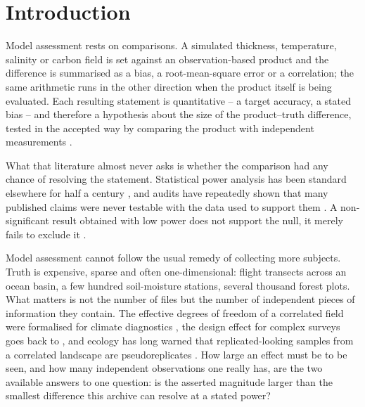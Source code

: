 \documentclass[preprint,12pt,authoryear]{elsarticle}
\begin{document}
\section{Introduction}

Model assessment rests on comparisons. A simulated thickness, temperature, salinity or carbon field is set against an observation-based product and the difference is summarised as a bias, a root-mean-square error or a correlation; the same arithmetic runs in the other direction when the product itself is being evaluated. Each resulting statement is quantitative -- a target accuracy, a stated bias -- and therefore a hypothesis about the size of the product--truth difference, tested in the accepted way by comparing the product with independent measurements \citep[e.g.,][]{loew2017validation,merchant2017uncertainty,taylor2001summarizing}.

What that literature almost never asks is whether the comparison had any chance of resolving the statement. Statistical power analysis has been standard elsewhere for half a century \citep{cohen1992power,lenth2001some,nakagawa2007effect}, and audits have repeatedly shown that many published claims were never testable with the data used to support them \citep{sedlmeier1989do,ioannidis2005why,button2013power}. A non-significant result obtained with low power does not support the null, it merely fails to exclude it \citep{altman1995absence,greenland2016statistical}.

Model assessment cannot follow the usual remedy of collecting more subjects. Truth is expensive, sparse and often one-dimensional: flight transects across an ocean basin, a few hundred soil-moisture stations, several thousand forest plots. What matters is not the number of files but the number of independent pieces of information they contain. The effective degrees of freedom of a correlated field were formalised for climate diagnostics \citep{bretherton1999effective,zwiers1995taking}, the design effect for complex surveys goes back to \citet{kish1965survey}, and ecology has long warned that replicated-looking samples from a correlated landscape are pseudoreplicates \citep{hurlbert1984pseudoreplication,legendre1993spatial,dutilleul1993modifying}. How large an effect must be to be seen, and how many independent observations one really has, are the two available answers to one question: is the asserted magnitude larger than the smallest difference this archive can resolve at a stated power?
\end{document}
